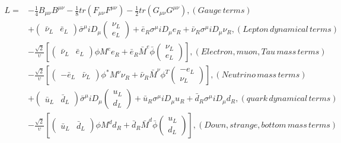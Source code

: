 \begin{equation}
  \begin{alignedat}{2}
  L = & -\frac{1}{4}B_{\mu\nu}B^{\mu\nu} - \frac{1}{8}tr(F_{\mu\nu}F^{\mu\nu}) - \frac{1}{2}tr(G_{\mu\nu}G^{\mu\nu}), (Gauge \, terms) \\
      & +\begin{pmatrix} \bar{\nu}_{L} & \bar{e}_{L} \end{pmatrix}\bar{\sigma}^{\mu}iD_{\mu}\begin{pmatrix} \nu_{L} \\ e_{L} \end{pmatrix} + \bar{e}_{R}\sigma^{\mu}iD_{\mu}e_{R} + \bar{\nu}_{R}\sigma^{\mu}iD_{\mu}\nu_{R}, (Lepton \, dynamical \, terms) \\
      & -\frac{\sqrt{2}}{\upsilon}[\begin{pmatrix} \bar{\nu}_{L} & \bar{e}_{L} \end{pmatrix}\phi M^{e}e_{R} + \bar{e}_{R}\bar{M}^{e}\bar{\phi}\begin{pmatrix} \nu_{L} \\ e_{L} \end{pmatrix}], (Electron, muon, Tau \, mass \, terms) \\
      & -\frac{\sqrt{2}}{\upsilon}[\begin{pmatrix} -\bar{e}_{L} & \bar{\nu}_{L} \end{pmatrix}\phi^{*} M^{\nu}\nu_{R} + \bar{\nu}_{R}\bar{M}^{\nu}\phi^{T}\begin{pmatrix} -e_{L} \\ \nu_{L} \end{pmatrix}], (Neutrino \, mass \, terms) \\
      & +\begin{pmatrix} \bar{u}_{L} & \bar{d}_{L} \end{pmatrix}\bar{\sigma}^{\mu}iD_{\mu}\begin{pmatrix} u_{L} \\ d_{L} \end{pmatrix} + \bar{u}_{R}\sigma^{\mu}iD_{\mu}u_{R} + \bar{d}_{R}\sigma^{\mu}iD_{\mu}d_{R}, (quark \, dynamical \, terms) \\
      & -\frac{\sqrt{2}}{\upsilon}[\begin{pmatrix} \bar{u}_{L} & \bar{d}_{L} \end{pmatrix}\phi M^{d}d_{R} + \bar{d}_{R}\bar{M}^{d}\bar{\phi}\begin{pmatrix} u_{L} \\ d_{L} \end{pmatrix}], (Down, strange, bottom \, mass \, terms) \\

\end{alignedat}
\end{equation}
